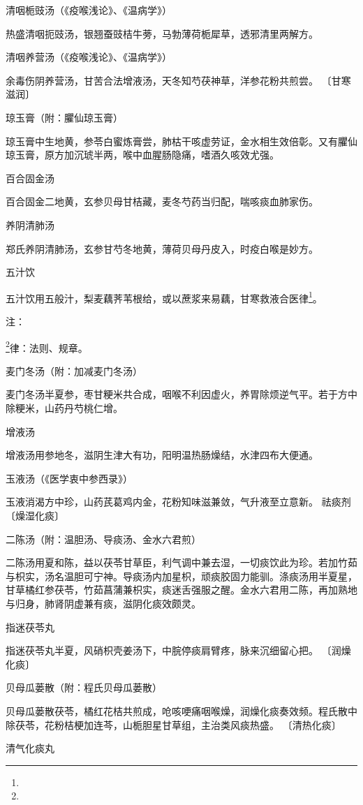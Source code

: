 \documentclass[a4paper,12pt,UTF8,twoside]{ctexbook}
\begin{document}
清咽栀豉汤（《疫喉浅论》、《温病学》）

热盛清咽扼豉汤，银翘蚕豉桔牛蒡，马勃薄荷栀犀草，透邪清里两解方。

清咽养营汤（《疫喉浅论》、《温病学》）

余毒伤阴养营汤，甘苦合法增液汤，天冬知芍茯神草，洋参花粉共煎尝。
〔甘寒滋润〕

琼玉膏（附：臞仙琼玉膏）

琼玉膏中生地黄，参苓白蜜炼膏尝，肺枯干咳虚劳证，金水相生效倍彰。又有臞仙琼玉膏，原方加沉琥半两，喉中血腥肠隐痛，嗜酒久咳效尤强。

百合固金汤

百合固金二地黄，玄参贝母甘桔藏，麦冬芍药当归配，喘咳痰血肺家伤。

养阴清肺汤

郑氏养阴清肺汤，玄参甘芍冬地黄，薄荷贝母丹皮入，时疫白喉是妙方。

五汁饮

五汁饮用五般汁，梨麦藕荠苇根给，或以蔗浆来易藕，甘寒救液合医律\footnote{}。

注：

\footnote{}律：法则、规章。

麦门冬汤（附：加减麦门冬汤）

麦门冬汤半夏参，枣甘粳米共合成，咽喉不利因虚火，养胃除烦逆气平。若于方中除粳米，山药丹芍桃仁增。

增液汤

增液汤用参地冬，滋阴生津大有功，阳明温热肠燥结，水津四布大便通。

玉液汤（《医学衷中参西录》）

玉液消渴方中珍，山药芪葛鸡内金，花粉知味滋兼敛，气升液至立意新。
祛痰剂
〔燥湿化痰〕

二陈汤（附：温胆汤、导痰汤、金水六君煎）

二陈汤用夏和陈，益以茯苓甘草臣，利气调中兼去湿，一切痰饮此为珍。若加竹茹与枳实，汤名温胆可宁神。导痰汤内加星枳，顽痰胶固力能驯。涤痰汤用半夏星，甘草橘红参茯苓，竹茹菖蒲兼枳实，痰迷舌强服之醒。金水六君用二陈，再加熟地与归身，肺肾阴虚兼有痰，滋阴化痰效颇灵。

指迷茯苓丸

指迷茯苓丸半夏，风硝枳壳姜汤下，中脘停痰肩臂疼，脉来沉细留心把。
〔润燥化痰〕

贝母瓜蒌散（附：程氏贝母瓜蒌散）

贝母瓜蒌散茯苓，橘红花桔共煎成，呛咳哽痛咽喉燥，润燥化痰奏效频。程氏散中除茯苓，花粉桔梗加连芩，山栀胆星甘草组，主治类风痰热盛。
〔清热化痰〕

清气化痰丸
\end{document}
